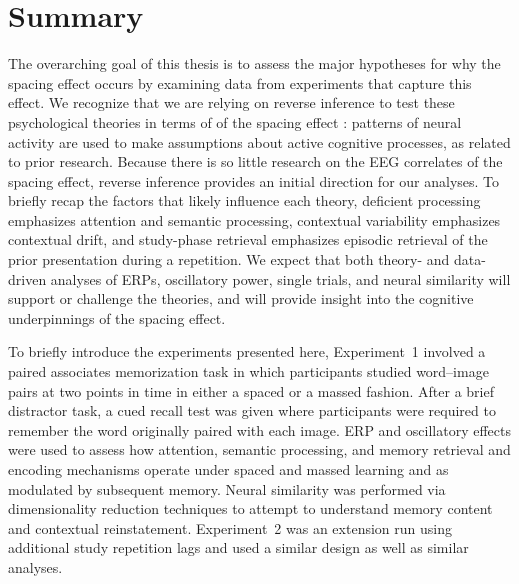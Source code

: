 
\section{Summary}


The overarching goal of this thesis is to assess the major hypotheses for why the spacing effect occurs by examining data from experiments that capture this effect.
We recognize that we are relying on reverse inference to test these psychological theories in terms of of the spacing effect \cite{Pold2006,PoldWagn2004}: patterns of neural activity are used to make assumptions about active cognitive processes, as related to prior research.  Because there is so little research on the EEG correlates of the spacing effect, reverse inference provides an initial direction for our analyses.
To briefly recap the factors that likely influence each theory, deficient processing emphasizes attention and semantic processing, contextual variability emphasizes contextual drift,
and study-phase retrieval emphasizes episodic retrieval of the prior presentation during a repetition.
We expect that both theory- and data-driven analyses of ERPs, oscillatory power, single trials, and
neural similarity will support or challenge the theories, and will provide insight into the cognitive underpinnings of the spacing effect.

To briefly introduce the experiments presented here,
Experiment~1 involved a paired associates memorization task in which participants studied word--image pairs at two points in time in either a spaced or a massed fashion.  After a brief distractor task, a cued recall test was given where participants were required to remember the word originally paired with each image.
ERP and oscillatory effects were used to assess how attention, semantic processing, and memory retrieval and encoding mechanisms operate under spaced and massed learning and as modulated by subsequent memory.  Neural similarity was performed via dimensionality reduction techniques to attempt to understand memory content and contextual reinstatement.
Experiment~2 was an extension run using additional study repetition lags and used a similar design as well as similar analyses.

